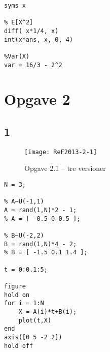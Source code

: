 \documentclass{article}
\begin{document}
\begin{lstlisting}[caption=Opg 1.3, style=Code-Matlab, label=lst:1.3]
syms x

% E[X^2]
diff( x*1/4, x)
int(x*ans, x, 0, 4)

%Var(X) 
var = 16/3 - 2^2

\end{lstlisting}

\newpage

\section*{Opgave 2} %
\label{sec:opgave_2}

\subsection*{1} %
\label{sub:subsection_name}


\begin{figure}[hbtp]
\centering
\texttt{[image: ReF2013-2-1]}
\caption{Opgave 2.1 -- tre versioner}
\label{fig:opg21}
\end{figure}

\begin{lstlisting}[caption=Matlab kode for Figur \ref{fig:opg21}, style=Code-Matlab, label=lst:21]
N = 3;

% A~U(-1,1)
A = rand(1,N)*2 - 1;
% A = [ -0.5 0 0.5 ];

% B~U(-2,2)
B = rand(1,N)*4 - 2;
% B = [ -1.5 0.1 1.4 ];

t = 0:0.1:5;

figure
hold on
for i = 1:N
    X = A(i)*t+B(i);
    plot(t,X)
end
axis([0 5 -2 2])
hold off
\end{lstlisting}
\end{document}
